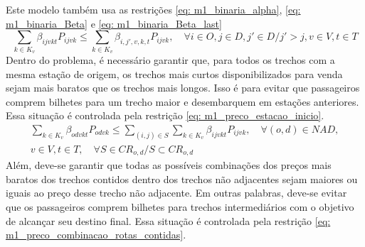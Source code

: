 Este modelo também usa as restrições \eqref{eq: m1_binaria_alpha}, \eqref{eq: m1_binaria_Beta} e
\eqref{eq: m1_binaria_Beta_last}
\begin{equation}
	\sum_{k \in K_v}\beta_{ijvkt}P_{ijvk} \leq \sum_{k \in K_v}\beta_{i,j',v,k,t}P_{ijvk}, \quad \forall i \in O, j \in D, j' \in D / j' > j, v \in V, t \in T    \label{eq: m1_preco_estacao_inicio}
\end{equation}
Dentro do problema, é necessário garantir que, para todos os trechos com a mesma estação de origem, os trechos mais curtos disponibilizados para venda sejam mais baratos que os trechos mais longos. Isso é para evitar que passageiros comprem bilhetes para um trecho maior e desembarquem em estações anteriores. Essa situação é controlada pela restrição \eqref{eq: m1_preco_estacao_inicio}.
\begin{equation}
	\begin{split}
		\sum_{k \in K_v}\beta_{odvkt}P_{odvk} \leq \sum_{(i,j) \in S}\sum_{k \in K_v}\beta_{ijvkt}P_{ijvk}, \quad    \forall (o,d) \in NAD, \\
		v \in V, t \in T , \quad  \forall S \in CR_{o,d} / S \subset CR_{o,d}   \label{eq: m1_preco_combinacao_rotas_contidas}
	\end{split}
\end{equation}
Além, deve-se garantir que todas as possíveis combinações dos preços mais baratos dos trechos contidos dentro dos trechos não adjacentes sejam maiores ou iguais ao preço desse trecho não adjacente. Em outras palabras, deve-se evitar que os passageiros comprem bilhetes para trechos intermediários com o objetivo de alcançar seu destino final. Essa situação é controlada pela restrição \eqref{eq: m1_preco_combinacao_rotas_contidas}.

